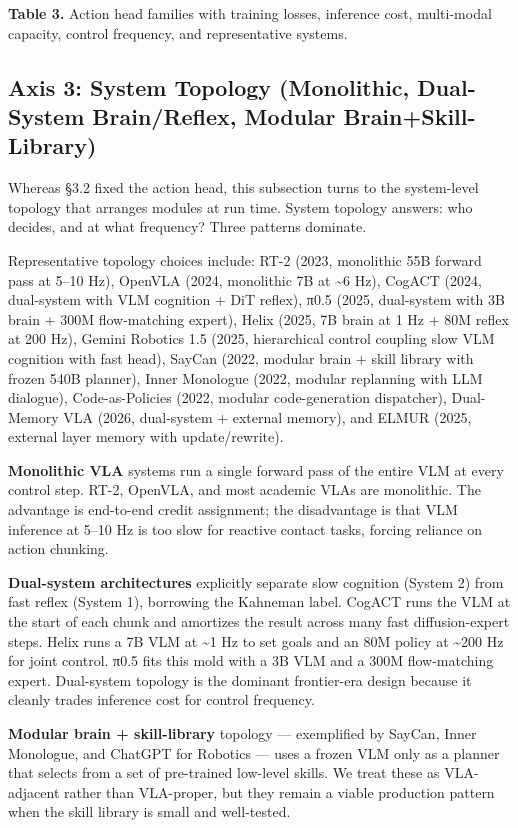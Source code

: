 \textbf{Table 3.} Action head families with training losses, inference cost, multi-modal capacity, control frequency, and representative systems.

\subsection{Axis 3: System Topology (Monolithic, Dual-System Brain/Reflex, Modular Brain+Skill-Library)}\label{axis-3-system-topology-monolithic-dual-system-brainreflex-modular-brainskill-library}

Whereas §3.2 fixed the action head, this subsection turns to the system-level topology that arranges modules at run time. System topology answers: who decides, and at what frequency? Three patterns dominate.

Representative topology choices include: RT-2 (2023, monolithic 55B forward pass at 5--10 Hz), OpenVLA (2024, monolithic 7B at \textasciitilde6 Hz), CogACT (2024, dual-system with VLM cognition + DiT reflex), π0.5 (2025, dual-system with 3B brain + 300M flow-matching expert), Helix (2025, 7B brain at 1 Hz + 80M reflex at 200 Hz), Gemini Robotics 1.5 (2025, hierarchical control coupling slow VLM cognition with fast head), SayCan (2022, modular brain + skill library with frozen 540B planner), Inner Monologue (2022, modular replanning with LLM dialogue), Code-as-Policies (2022, modular code-generation dispatcher), Dual-Memory VLA (2026, dual-system + external memory), and ELMUR (2025, external layer memory with update/rewrite).

\textbf{Monolithic VLA} systems run a single forward pass of the entire VLM at every control step. RT-2, OpenVLA, and most academic VLAs are monolithic. The advantage is end-to-end credit assignment; the disadvantage is that VLM inference at 5--10 Hz is too slow for reactive contact tasks, forcing reliance on action chunking.

\textbf{Dual-system architectures} explicitly separate slow cognition (System 2) from fast reflex (System 1), borrowing the Kahneman label. CogACT runs the VLM at the start of each chunk and amortizes the result across many fast diffusion-expert steps. Helix runs a 7B VLM at \textasciitilde1 Hz to set goals and an 80M policy at \textasciitilde200 Hz for joint control. π0.5 fits this mold with a 3B VLM and a 300M flow-matching expert. Dual-system topology is the dominant frontier-era design because it cleanly trades inference cost for control frequency.

\textbf{Modular brain + skill-library} topology --- exemplified by SayCan, Inner Monologue, and ChatGPT for Robotics --- uses a frozen VLM only as a planner that selects from a set of pre-trained low-level skills. We treat these as VLA-adjacent rather than VLA-proper, but they remain a viable production pattern when the skill library is small and well-tested.

